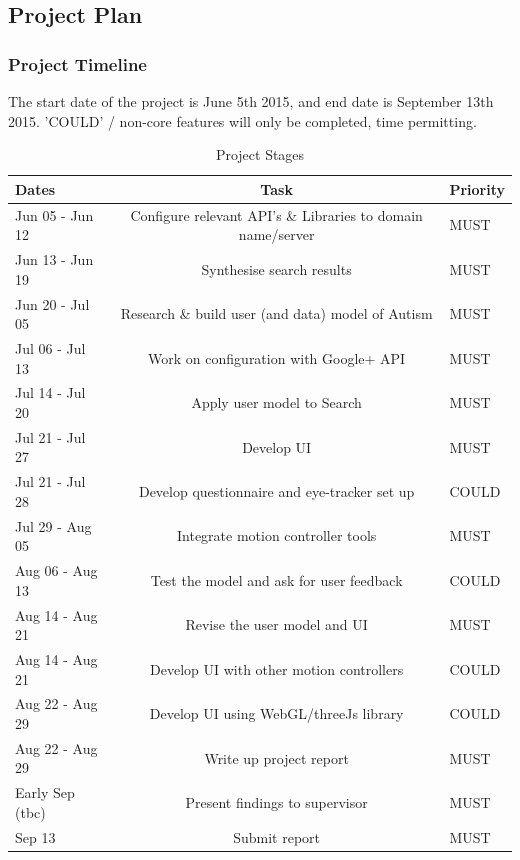 \documentclass[a4paper, 10pt]{article}
\begin{document}
\subsection{Project Plan}\label{plan}

\subsubsection{Project Timeline}
The start date of the project is June 5th 2015, and end date is September 13th 2015. 'COULD' / non-core features will only be completed, time permitting.
\begin{table}[h]
\caption{Project Stages} 
\centering
\begin{tabular}{ L |c| L}
\hline\hline 
Dates & Task & Priority\\ [0.5ex]
\hline 
Jun 05 - Jun 12 & Configure relevant API's \& Libraries to domain name/server & MUST\\
\hline 
Jun 13 - Jun 19 & Synthesise search results & MUST\\
\hline 
Jun 20 - Jul 05 & Research \& build user (and data) model of Autism & MUST\\
\hline 
Jul 06 - Jul 13 & Work on configuration with Google+ API & MUST\\
\hline 
Jul 14 - Jul 20 & Apply user model to Search& MUST\\ 
\hline 
Jul 21 - Jul 27 & Develop UI & MUST\\
\hline 
Jul 21 - Jul 28 & Develop questionnaire and eye-tracker set up & COULD\\
\hline 
Jul 29 - Aug 05 & Integrate motion controller tools& MUST\\
\hline 
Aug 06 - Aug 13 & Test the model and ask for user feedback & COULD\\
\hline 
Aug 14 - Aug 21 & Revise the user model and UI & MUST\\
\hline 
Aug 14 - Aug 21 & Develop UI with other motion controllers & COULD\\
\hline 
Aug 22 - Aug 29 & Develop UI using WebGL/threeJs library & COULD\\
\hline 
Aug 22 - Aug 29 & Write up project report & MUST\\ 
\hline 
Early Sep (tbc) & Present findings to supervisor & MUST\\
\hline 
Sep 13 & Submit report & MUST\\[0.5ex]
\hline
\end{tabular}
\label{stages} 
\end{table}
\end{document}
